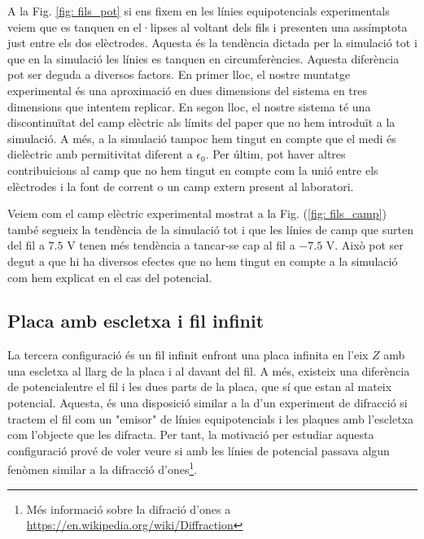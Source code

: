 \documentclass[11pt]{article}
\begin{document}
A la Fig. \ref{fig: fils_pot} si ens fixem en les línies equipotencials experimentals veiem que es tanquen en el·lipses al voltant dels fils i presenten una assímptota just entre els dos elèctrodes. Aquesta és la tendència dictada per la simulació tot i que en la simulació les línies es tanquen en circumferències. Aquesta diferència pot ser deguda a diversos factors. En primer lloc, el nostre muntatge experimental és una aproximació en dues dimensions del sistema en tres dimensions que intentem replicar. En segon lloc, el nostre sistema té una discontinuïtat del camp elèctric als límits del paper que no hem introduït a la simulació. A més, a la simulació tampoc hem tingut en compte que el medi és dielèctric amb permitivitat diferent a $\epsilon_0$. Per últim, pot haver altres contribuicions al camp que no hem tingut en compte com la unió entre els elèctrodes i la font de corrent o un camp extern present al laboratori.

Veiem com el camp elèctric  experimental mostrat a la Fig. (\ref{fig: fils_camp}) també segueix la tendència de la simulació tot i que les línies de camp que surten del fil a $7.5$ V tenen més tendència a tancar-se cap al fil a $-7.5$ V. Això pot ser degut a que hi ha diversos efectes que no hem tingut en compte a la simulació com hem explicat en el cas del potencial. 

\subsection{Placa amb escletxa i fil infinit}\label{sec:lliure}
La tercera configuració és un fil infinit enfront una placa infinita en l'eix $Z$ amb una escletxa al llarg de la placa i al davant del fil. A més, existeix una diferència de potencialentre el fil i les dues parts de la placa, que sí que estan al mateix potencial. Aquesta, és una disposició similar a la d'un experiment de difracció si tractem el fil com un "emisor" de línies equipotencials i les plaques amb l'escletxa com l'objecte que les difracta. Per tant, la motivació per estudiar aquesta configuració prové de voler veure si amb les línies de potencial passava algun fenòmen similar a la difracció d'ones\footnote{Més informació sobre la difració d'ones a \url{https://en.wikipedia.org/wiki/Diffraction}}.
\end{document}
